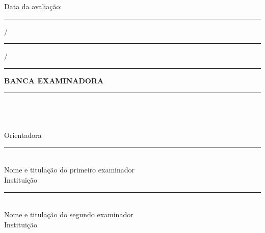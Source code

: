 \cleardoublepage
\thispagestyle{empty}
\begin{center}
\textbf{\MakeUppercase{\imprimirautor}}
\vspace{1.2cm}

\textbf{\MakeUppercase{\imprimirtitulo}}
\end{center}
\vspace{1cm}
\noindent\imprimirpreambulo

\vspace{0.8cm}
\noindent Data da avaliação: \rule{1cm}{0.4pt}/\rule{1cm}{0.4pt}/\rule{1.5cm}{0.4pt}

\vspace{0.8cm}
\begin{center}
\textbf{BANCA EXAMINADORA}
\vspace{1cm}

\rule{11cm}{0.4pt}\\
\imprimirorientadortitulo\ \imprimirorientador\\
\imprimirinstituicao\\
Orientadora
\vspace{1.1cm}

\rule{11cm}{0.4pt}\\
Nome e titulação do primeiro examinador\\
Instituição
\vspace{1.1cm}

\rule{11cm}{0.4pt}\\
Nome e titulação do segundo examinador\\
Instituição
\end{center}
\vfill
{}
\cleardoublepage
